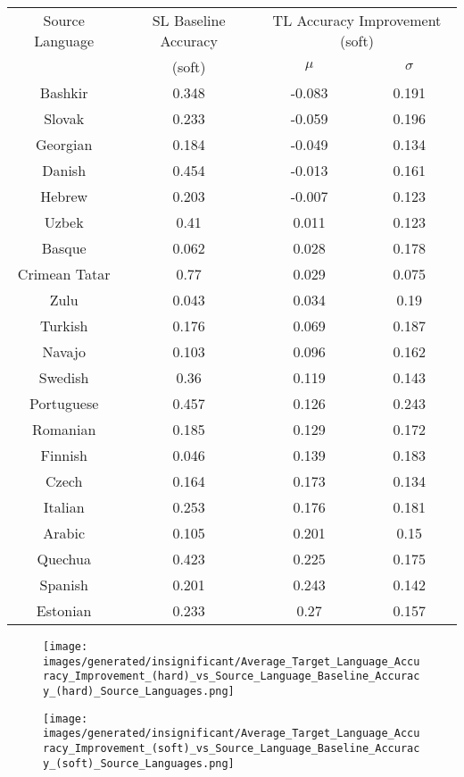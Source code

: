\begin{tabular}{|c|c|c|c|}
\hline
Source Language & SL Baseline Accuracy & \multicolumn{2}{|c|}{TL Accuracy Improvement (soft)} \\
& (soft) & $\mu$ & $\sigma$ \\
\hline
\hline
Bashkir & 0.348 & -0.083 & 0.191\\
\hline
Slovak & 0.233 & -0.059 & 0.196\\
\hline
Georgian & 0.184 & -0.049 & 0.134\\
\hline
Danish & 0.454 & -0.013 & 0.161\\
\hline
Hebrew & 0.203 & -0.007 & 0.123\\
\hline
Uzbek & 0.41 & 0.011 & 0.123\\
\hline
Basque & 0.062 & 0.028 & 0.178\\
\hline
Crimean Tatar & 0.77 & 0.029 & 0.075\\
\hline
Zulu & 0.043 & 0.034 & 0.19\\
\hline
Turkish & 0.176 & 0.069 & 0.187\\
\hline
Navajo & 0.103 & 0.096 & 0.162\\
\hline
Swedish & 0.36 & 0.119 & 0.143\\
\hline
Portuguese & 0.457 & 0.126 & 0.243\\
\hline
Romanian & 0.185 & 0.129 & 0.172\\
\hline
Finnish & 0.046 & 0.139 & 0.183\\
\hline
Czech & 0.164 & 0.173 & 0.134\\
\hline
Italian & 0.253 & 0.176 & 0.181\\
\hline
Arabic & 0.105 & 0.201 & 0.15\\
\hline
Quechua & 0.423 & 0.225 & 0.175\\
\hline
Spanish & 0.201 & 0.243 & 0.142\\
\hline
Estonian & 0.233 & 0.27 & 0.157\\
\hline
\end{tabular}

\begin{figure}[ht]
\texttt{[image: images/generated/insignificant/Average\_Target\_Language\_Accuracy\_Improvement\_(hard)\_vs\_Source\_Language\_Baseline\_Accuracy\_(hard)\_Source\_Languages.png]}
\centering
\caption{}
\end{figure}

\begin{figure}[ht]
\texttt{[image: images/generated/insignificant/Average\_Target\_Language\_Accuracy\_Improvement\_(soft)\_vs\_Source\_Language\_Baseline\_Accuracy\_(soft)\_Source\_Languages.png]}
\centering
\caption{}
\end{figure}

